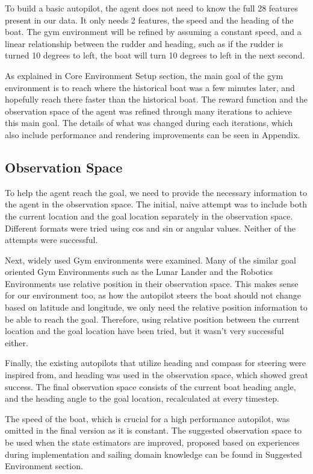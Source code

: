 \documentclass[12pt,twoside]{report}
\begin{document}
To build a basic autopilot, the agent does not need to know the full 28 features present in our data. It only needs 2 features, the speed and the heading of the boat. The gym environment will be refined by assuming a constant speed, and a linear relationship between the rudder and heading, such as if the rudder is turned 10 degrees to left, the boat will turn 10 degrees to left in the next second.

As explained in Core Environment Setup section, the main goal of the gym environment is to reach where the historical boat was a few minutes later, and hopefully reach there faster than the historical boat. The reward function and the observation space of the agent was refined through many iterations to achieve this main goal. The details of what was changed during each iterations, which also include performance and rendering improvements can be seen in Appendix.

\subsection{Observation Space}
To help the agent reach the goal, we need to provide the necessary information to the agent in the observation space. The initial, naive attempt was to include both the current location and the goal location separately in the observation space. Different formats were tried using cos and sin or angular values. Neither of the attempts were successful.

Next, widely used Gym environments were examined. Many of the similar goal oriented Gym Environments such as the Lunar Lander \cite{LunarLander-v2} and the Robotics Environments \cite{gym-robotics} use relative position in their observation space. This makes sense for our environment too, as how the autopilot steers the boat should not change based on latitude and longitude, we only need the relative position information to be able to reach the goal. Therefore, using relative position between the current location and the goal location have been tried, but it wasn't very successful either. 

Finally, the existing autopilots that utilize heading and compass for steering were inspired from, and heading was used in the observation space, which showed great success. The final observation space consists of the current boat heading angle, and the heading angle to the goal location, recalculated at every timestep. 

The speed of the boat, which is crucial for a high performance autopilot, was omitted in the final version as it is constant. The suggested observation space to be used when the state estimators are improved, proposed based on experiences during implementation and sailing domain knowledge can be found in Suggested Environment section.
\end{document}
